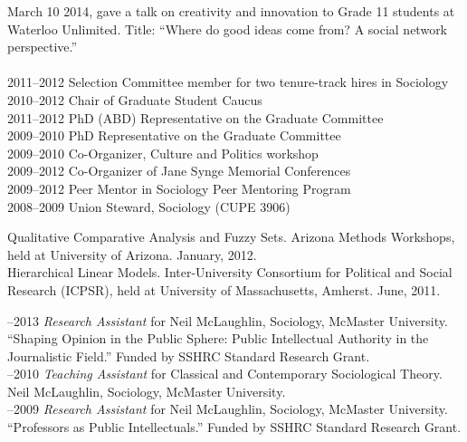 \documentclass[9pt,usenames,dvipsnames]{article}
\begin{document}
\ind March 10 2014, gave a talk on creativity and innovation to Grade 11 students at Waterloo Unlimited. Title: ``Where do good ideas come from? A social network perspective.'' \\

\\
2011–2012 Selection Committee member for two tenure-track hires in Sociology\\
2010–2012 Chair of Graduate Student Caucus\\
2011–2012 PhD (ABD) Representative on the Graduate Committee\\
2009–2010 PhD Representative on the Graduate Committee\\
2009–2010 Co-Organizer, Culture and Politics workshop\\
2009–2012 Co-Organizer of Jane Synge Memorial Conferences\\
2009–2012 Peer Mentor in Sociology Peer Mentoring Program\\
2008–2009 Union Steward, Sociology (CUPE 3906)\\



\ind Qualitative Comparative Analysis and Fuzzy Sets. Arizona Methods Workshops, held at University of Arizona. January, 2012.\\

\ind Hierarchical Linear Models. Inter-University Consortium for Political and Social Research (ICPSR), held at University of Massachusetts, Amherst. June, 2011.\\


–2013 {\it Research Assistant} for Neil McLaughlin, Sociology, McMaster University. ``Shaping Opinion in the Public Sphere: Public Intellectual Authority in the Journalistic Field.'' Funded by SSHRC Standard Research Grant.\\

–2010 {\it Teaching Assistant} for Classical and Contemporary Sociological Theory. Neil McLaughlin, Sociology, McMaster University.\\

–2009 {\it Research Assistant} for Neil McLaughlin, Sociology, McMaster University.\\
``Professors as Public Intellectuals.'' Funded by SSHRC Standard Research Grant.\\
\end{document}
